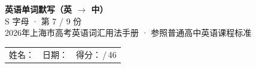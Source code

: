 \documentclass[10pt,a4paper]{article}
\begin{document}
\pagestyle{plain}

\begin{center}
{\LARGE\bfseries 英语单词默写（英 $\to$ 中）}\\[0.22em]
{\large S 字母 · 第 7 / 9 份}\\[0.18em]
{\small 2026年上海市高考英语词汇用法手册 · 参照普通高中英语课程标准}
\end{center}

\vspace{0.25em}
\noindent\begin{tabular}{@{}p{}@{}p{}@{}p{}@{}}
姓名：\underline{\hspace{2.0cm}} & 日期：\underline{\hspace{2.0cm}} & 得分：\underline{\hspace{1.3cm}}\,/\,46 \\
\end{tabular}

\vspace{0.3em}

\vspace{0.08em}
\end{document}
